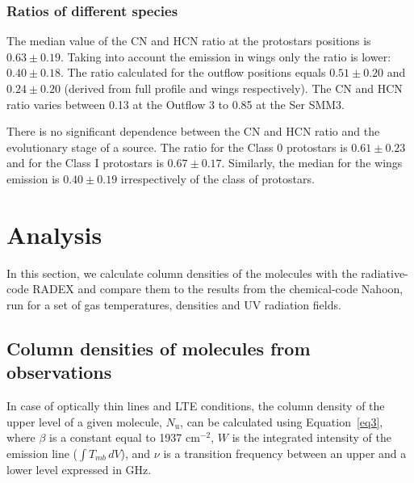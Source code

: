 \documentclass{aa}
\begin{document}
\subsubsection{Ratios of different species}
\label{subsection:statistics}

The median value of the CN and HCN ratio at the protostars positions is $0.63 \pm 0.19$. Taking into account the emission in wings only the ratio is lower: $0.40 \pm 0.18$. The ratio calculated for the outflow positions equals $0.51 \pm 0.20$ and $0.24 \pm 0.20$ (derived from full profile and wings respectively). 
The CN and HCN ratio varies between 0.13 at the Outflow 3 to 0.85 at the Ser SMM3. 

There is no significant dependence between the CN and HCN ratio and the evolutionary stage of a source. The ratio for the
Class 0 protostars is $0.61 \pm 0.23$ and for the Class I protostars is $0.67 \pm 0.17$. Similarly, the median for the wings emission is $0.40 \pm 0.19$ irrespectively of the class of protostars.

\section{Analysis}
\label{section:analysis}

In this section, we calculate column densities of the molecules with the radiative-code RADEX and compare them to the results from the chemical-code Nahoon, 
run for a set of gas temperatures, densities and UV radiation fields. 
\subsection{Column densities of molecules from observations}
\label{subsection:column_densities}


In case of optically thin lines and LTE conditions, the column density of the 
upper level of a given molecule, $N_\mathrm{u}$, can be calculated using Equation~\ref{eq3}, where $\beta$ is a constant equal to 1937 cm$^{-2}$, $W$ is the integrated
intensity of the emission line ($\int{T_{mb} \, dV}$), and $\nu$ is a transition 
frequency between an upper and a lower level expressed in GHz. 
\end{document}
